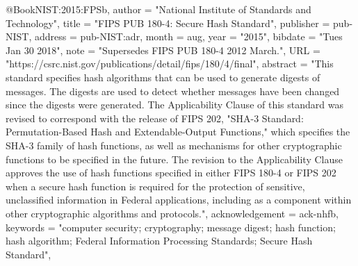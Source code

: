 @Book{NIST:2015:FPSb,
  author =       "{National Institute of Standards and Technology}",
  title =        "{FIPS PUB 180-4}: Secure Hash Standard",
  publisher =    pub-NIST,
  address =      pub-NIST:adr,
  month =        aug,
  year =         "2015",
  bibdate =      "Tues Jan 30 2018",
  note =         "Supersedes FIPS PUB 180-4 2012 March.",
  URL =          "https://csrc.nist.gov/publications/detail/fips/180/4/final",
  abstract =     "This standard specifies hash algorithms that can be used to generate digests of messages. The digests are used to detect whether messages have been changed since the digests were generated. The Applicability Clause of this standard was revised to correspond with the release of FIPS 202, "SHA-3 Standard: Permutation-Based Hash and Extendable-Output Functions," which specifies the SHA-3 family of hash functions, as well as mechanisms for other cryptographic functions to be specified in the future. The revision to the Applicability Clause approves the use of hash functions specified in either FIPS 180-4 or FIPS 202 when a secure hash function is required for the protection of sensitive, unclassified information in Federal applications, including as a component within other cryptographic algorithms and protocols.",
  acknowledgement = ack-nhfb,
  keywords =     "computer security; cryptography; message digest; hash function; hash algorithm; Federal Information Processing Standards; Secure Hash Standard",
}
